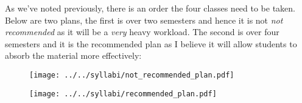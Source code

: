 

As we've noted previously, there is an order the four classes need to be taken. Below are two plans, the first is over two semesters and hence it is not \emph{not recommended} as it will be a \emph{very} heavy workload. The second is over four semesters and it is the recommended plan as I believe it will allow students to absorb the material more effectively:

\begin{figure}[htp]
\centering
\texttt{[image: ../../syllabi/not\_recommended\_plan.pdf]}
\label{fig:not_recommended}
\end{figure} 

\begin{figure}[htp]
\centering
\texttt{[image: ../../syllabi/recommended\_plan.pdf]}
\label{fig:recommended}
\end{figure} 